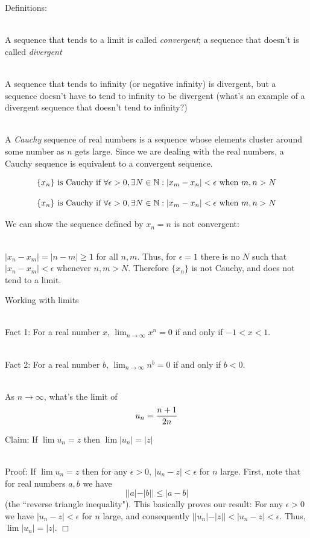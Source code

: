 \documentclass[10pt]{seminar}
\begin{document}
\begin{slide}
\newslide
Definitions:

\ \\A sequence that tends to a limit is called \textit{convergent}; a sequence that doesn't is called \textit{divergent}

\ \\A sequence that tends to infinity (or negative infinity) is divergent, but a sequence doesn't have to tend to infinity to be divergent (what's an example of a divergent sequence that doesn't tend to infinity?)

\ \\A \textit{Cauchy } sequence of real numbers is a sequence whose elements cluster around some number as $n$ gets large.  Since we are dealing with the real numbers, a Cauchy sequence is equivalent to a convergent sequence. %

$$\{x_n\} \hbox{ is Cauchy if } \forall\epsilon>0, \exists N\in \mathbb{N}:|x_m-x_n|<\epsilon \hbox{ when }m, n>N$$

\newslide

$$\{x_n\} \hbox{ is Cauchy if } \forall\epsilon>0, \exists N\in \mathbb{N}:|x_m-x_n|<\epsilon \hbox{ when }m, n>N$$

We can show the sequence defined by $x_n=n$ is not convergent:

\ \\$|x_n-x_m|=|n-m|\geq 1$ for all $n, m$.  Thus, for $\epsilon=1$ there is no $N$ such that $|x_n-x_m|<\epsilon$ whenever $n, m>N$.  Therefore $\{x_n\}$ is not Cauchy, and does not tend to a limit.

\newslide
Working with limits

\ \\Fact 1: For a real number $x$, $\lim_{n\rightarrow\infty}x^n=0$ if and only if $-1<x<1$.

\ \\Fact 2: For a real number $b$, $\lim_{n\rightarrow\infty}n^b=0$ if and only if $b<0$.

\ \\ As $n\rightarrow \infty$, what's the limit of $$u_n={{n+1}\over{2n}} $$ %

\newslide Claim: If $\lim u_n=z$ then $\lim |u_n |=|z|$

\ \\Proof: If $\lim u_n=z$ then for any $\epsilon>0$,  $|u_n-z|<\epsilon$ for $n$ large.  First, note that for real numbers $a, b$ we have $$||a|-|b||\leq |a-b|$$ (the ``reverse triangle inequality").  This basically proves our result: For any $\epsilon >0$ we have $|u_n-z|<\epsilon$ for $n$ large, and consequently $||u_n|-|z||<|u_n-z|<\epsilon$.  Thus, $\lim |u_n |=|z|$. $\Box$


\end{slide}
\end{document}
